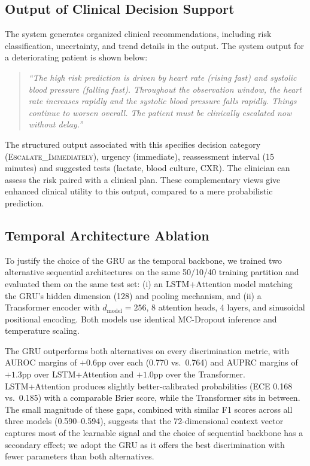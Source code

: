 \documentclass[runningheads]{llncs}
\begin{document}
\subsection{Output of Clinical Decision Support}

The system generates organized clinical recommendations, including risk classification, uncertainty, and trend details in the output. The system output for a deteriorating patient is shown below:

\begin{quote}
\textit{``The high risk prediction is driven by heart rate (rising fast) and systolic blood pressure (falling fast). Throughout the observation window, the heart rate increases rapidly and the systolic blood pressure falls rapidly. Things continue to worsen overall. The patient must be clinically escalated now without delay.''}
\end{quote}

The structured output associated with this specifies decision category (\textsc{Escalate\_\allowbreak Immediately}), urgency (immediate), reassessment interval (15 minutes) and suggested tests (lactate, blood culture, CXR). The clinician can assess the risk paired with a clinical plan. These complementary views give enhanced clinical utility to this output, compared to a mere probabilistic prediction.

\subsection{Temporal Architecture Ablation}

To justify the choice of the GRU as the temporal backbone, we trained two alternative sequential architectures on the same 50/10/40 training partition and evaluated them on the same test set: (i) an LSTM+Attention model matching the GRU's hidden dimension (128) and pooling mechanism, and (ii) a Transformer encoder with $d_\text{model}=256$, 8 attention heads, 4 layers, and sinusoidal positional encoding. Both models use identical MC-Dropout inference and temperature scaling.

The GRU outperforms both alternatives on every discrimination metric, with AUROC margins of $+0.6$pp over each (0.770 vs.\ 0.764) and AUPRC margins of $+1.3$pp over LSTM+Attention and $+1.0$pp over the Transformer. LSTM+Attention produces slightly better-calibrated probabilities (ECE 0.168 vs.\ 0.185) with a comparable Brier score, while the Transformer sits in between. The small magnitude of these gaps, combined with similar F1 scores across all three models (0.590--0.594), suggests that the 72-dimensional context vector captures most of the learnable signal and the choice of sequential backbone has a secondary effect; we adopt the GRU as it offers the best discrimination with fewer parameters than both alternatives.
\end{document}
